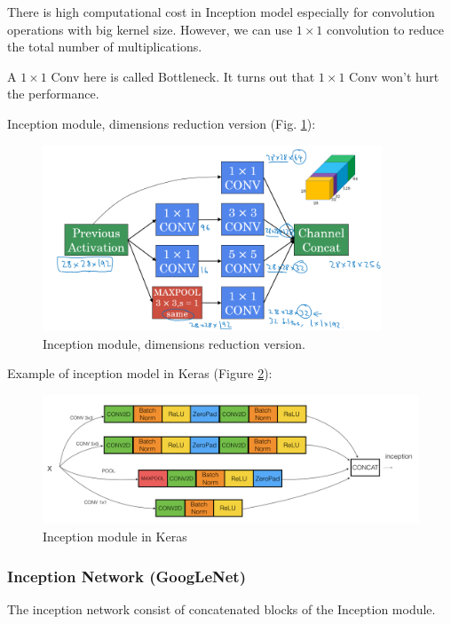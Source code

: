 
There is high computational cost in Inception model especially for convolution operations with big kernel size. However, we can use $1\times 1$ convolution to reduce the total number of multiplications.

A $1\times 1$ Conv here is called Bottleneck. It turns out that $1\times 1$ Conv won't hurt the performance.

Inception module, dimensions reduction version (Fig. \ref{inception-reduced}):

\begin{figure}[!htbp]
    \centering
    \includegraphics[width=0.9\textwidth]{img/c4/inception-reduced.png}
    \caption{Inception module, dimensions reduction version.}
    \label{inception-reduced}
\end{figure}

Example of inception model in Keras (Figure \ref{inception-keras}):

\begin{figure}[!htbp]
    \centering 
    \includegraphics[width=1.0\textwidth]{img/c4/inception_keras.png}
    \caption{Inception module in Keras}
    \label{inception-keras}
\end{figure}

\subsubsection{Inception Network (GoogLeNet)}
The inception network consist of concatenated blocks of the Inception module.

